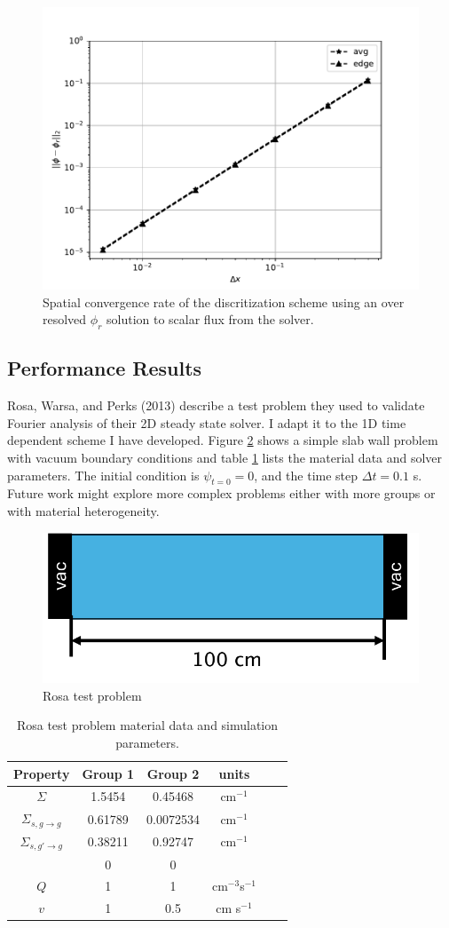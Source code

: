 \begin{figure}[h!]
    \centering
    \includegraphics[width=.5\textwidth]{figures/results/convergance_rate.pdf}
    \caption{Spatial convergence rate of the discritization scheme using an over resolved $\phi_r$ solution to scalar flux from the solver.}
    \label{fig:mms_sol}
\end{figure}


\subsection{Performance Results}

Rosa, Warsa, and Perks (2013)\cite{rosa_cellwise_2013} describe a test problem they used to validate Fourier analysis of their 2D steady state solver.
I adapt it to the 1D time dependent scheme I have developed.
Figure \ref{fig:rosa_test} shows a simple slab wall problem with vacuum boundary conditions and table \ref{table:rosa_test} lists the material data and solver parameters.
The initial condition is $\psi_{t=0} = 0$, and the time step $\Delta t = 0.1$ s.
Future work might explore more complex problems either with more groups or with material heterogeneity.

\begin{figure}[h!]
    \centering
    \includegraphics[width=.4\textwidth]{figures/results/rtest.pdf}
    \caption{Rosa test problem}
    \label{fig:rosa_test}
\end{figure}

\begin{table}[!htb]
  \centering
  \begin{tabular}{c c c c c c  } \hline 
    Property & Group 1 & Group 2 & units \\ \hline
    $\Sigma$ & 1.5454 &  0.45468 & cm$^{-1}$  \\
    $\Sigma_{s,g\rightarrow g}$  & 0.61789 &  0.0072534 & cm$^{-1}$  \\
    $\Sigma_{s,g'\rightarrow g}$  & 0.38211 &  0.92747 & cm$^{-1}$ \\  & 0 & 0 & \\
    $Q$ & 1 & 1 & cm$^{-3}$s$^{-1}$\\
    $v$ & 1 & 0.5 & cm s$^{-1}$ \\
    \hline
  \end{tabular}
  \caption{Rosa test problem material data and simulation parameters.}
  \label{table:rosa_test} 
\end{table}


